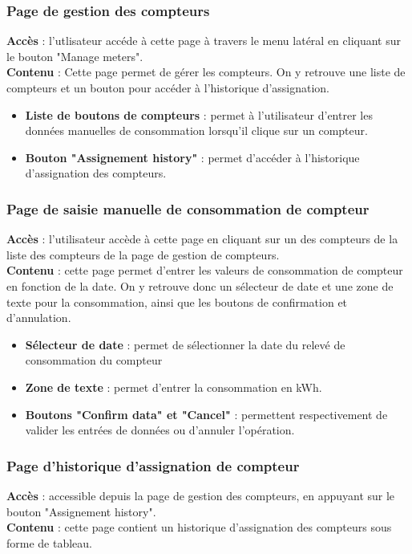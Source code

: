 \documentclass[../rapport.tex]{subfiles}
\begin{document}
\subsubsection{Page de gestion des compteurs}
\noindent \textbf{Accès} : l'utlisateur accéde à cette page à travers le menu latéral en cliquant sur le bouton "Manage meters". \\
\textbf{Contenu} : Cette page permet de gérer les compteurs. On y retrouve une liste de compteurs et un bouton pour accéder à l'historique d'assignation. 
\begin{itemize}
    \item \textbf{Liste de boutons de compteurs} : permet à l'utilisateur d'entrer les données manuelles de consommation lorsqu'il clique sur un compteur. 
    \item \textbf{Bouton "Assignement history"} : permet d'accéder à l'historique d'assignation des compteurs. 
\end{itemize}

\subsubsection{Page de saisie manuelle de consommation de compteur}
\noindent \textbf{Accès} : l'utilisateur accède à cette page en cliquant sur un des compteurs de la liste des compteurs de la page de gestion de compteurs. \\
\textbf{Contenu} : cette page permet d'entrer les valeurs de consommation de compteur en fonction de la date. On y retrouve donc un sélecteur de date et une zone de texte pour la consommation, ainsi que les boutons de confirmation et d'annulation. 
\begin{itemize}
    \item \textbf{Sélecteur de date} : permet de sélectionner la date du relevé de consommation du compteur
    \item \textbf{Zone de texte} : permet d'entrer la consommation en kWh. 
    \item \textbf{Boutons "Confirm data" et "Cancel"} : permettent respectivement de valider les entrées de données ou d'annuler l'opération.
\end{itemize}

\subsubsection{Page d'historique d'assignation de compteur}
\noindent \textbf{Accès} : accessible depuis la page de gestion des compteurs, en appuyant sur le bouton "Assignement history". \\
\textbf{Contenu} : cette page contient un historique d'assignation des compteurs sous forme de tableau.
\end{document}
